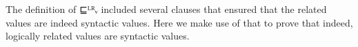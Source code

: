 \begin{code}[hide]%
\>[0]\AgdaSpace{}%
\AgdaSymbol{:}\AgdaSpace{}%
\AgdaSymbol{\}\{}\AgdaSymbol{\}\{}\AgdaSpace{}%
\AgdaSymbol{:}\AgdaSpace{}%
\AgdaSpace{}%
\AgdaSpace{}%
\AgdaSymbol{\}\{}\AgdaSymbol{\}\{}\AgdaSymbol{\}\{}\AgdaSymbol{\}\{}\AgdaSymbol{\}}\<%
\\
\>[0][@{}l@{\AgdaIndent{0}}]%
\>[2]\AgdaSpace{}%
\AgdaField{\#}\AgdaSymbol{(}\AgdaSpace{}%
\AgdaSpace{}%
\AgdaSpace{}%
\AgdaSpace{}%
\AgdaSpace{}%
\AgdaSpace{}%
\AgdaSymbol{)}\AgdaSpace{}%
\AgdaSymbol{(}\AgdaSpace{}%
\AgdaSymbol{)}\AgdaSpace{}%
\AgdaSpace{}%
\AgdaField{\#}\AgdaSymbol{(}\AgdaSpace{}%
\AgdaSpace{}%
\AgdaSpace{}%
\AgdaSpace{}%
\AgdaSymbol{)}\AgdaSpace{}%
\AgdaSymbol{(}\AgdaSpace{}%
\AgdaSymbol{)}\<%
\end{code}
\begin{code}[hide]%
\>[0]\AgdaSpace{}%
\AgdaSymbol{\{}\AgdaSymbol{\}\{}\AgdaSymbol{\}\{}\AgdaSymbol{\}\{}\AgdaSymbol{\}\{}\AgdaSymbol{\}\{}\AgdaSymbol{\}\{}\AgdaSymbol{\}}\AgdaSpace{}%
\AgdaSymbol{=}\<%
\\
\>[0][@{}l@{\AgdaIndent{0}}]%
\>[3]\AgdaSymbol{\{}\AgdaSpace{}%
\AgdaSymbol{=}\AgdaSpace{}%
\AgdaSpace{}%
\AgdaSymbol{\}}\AgdaSpace{}%
\AgdaSymbol{(}\AgdaSymbol{\{}\AgdaSymbol{\}\{}\AgdaSymbol{\}\{}\AgdaSymbol{\}\{}\AgdaSymbol{\}\{}\AgdaSymbol{\}\{}\AgdaSymbol{\})}\<%
\end{code}

The definition of ⊑ᴸᴿᵥ included several clauses that ensured that the
related values are indeed syntactic values. Here we make use of that
to prove that indeed, logically related values are syntactic values.

